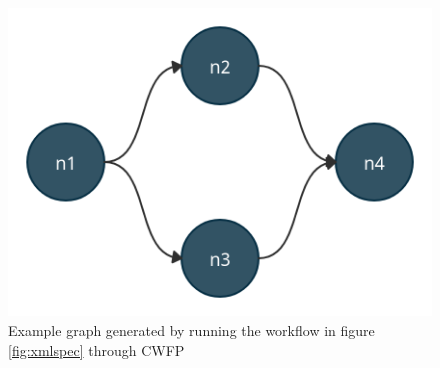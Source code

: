 \documentclass[fleqn,10pt]{SelfArx} %
\begin{document}
\begin{figure}[t!]
\centering
\includegraphics[width=\linewidth]{Figures/dag_example.png}
\caption{Example graph generated by running the workflow in figure \ref{fig:xmlspec} through CWFP}
\label{fig:dagexample}
\end{figure}
\end{document}
